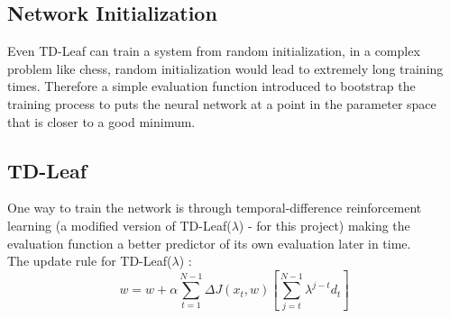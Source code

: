 		\subsection{Network Initialization}
			Even TD-Leaf can train a system from random initialization, in a complex problem like chess, random initialization would lead to extremely long training times. Therefore a simple evaluation function introduced to bootstrap the
			training process to puts the neural network at a point in the parameter space that is closer to a good minimum.
		\subsection{TD-Leaf}
			One way to train the network is through temporal-difference reinforcement learning (a modified version of TD-Leaf($\lambda$) - for this project) making 
			the evaluation function a better predictor of its own evaluation later in time.
			\\The update rule for TD-Leaf($\lambda$) :
			$$ w = w + \alpha \sum_{t=1}^{N-1} \Delta J(x_{t} ,w) [ \sum_ {j=t}^{N-1} \lambda^{j-t} d_{t} ]$$
